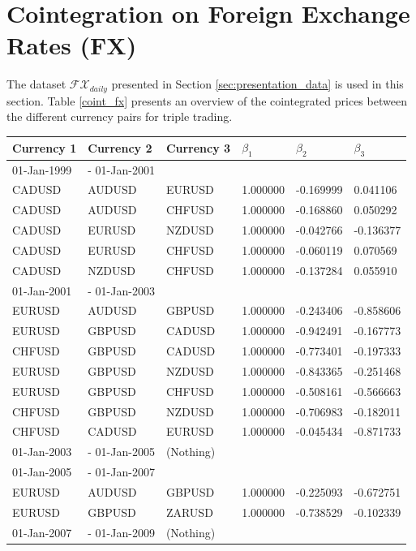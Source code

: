 \documentclass[11pt,a4,twosided,singlespacing,titlepagenumber=on]{scrreprt}
\numberwithin{equation}{chapter} %
\theoremstyle{remark}
\begin{document}
\section{Cointegration on Foreign Exchange Rates (FX)}

The dataset $\mathcal{FX}_{daily}$ presented in Section \ref{sec:presentation_data} is used in this section. Table \ref{coint_fx} presents an overview of the cointegrated prices between the different currency pairs for triple trading.

\begin{table}[H]
\centering
\begin{tabular}{llllll}
Currency 1      & Currency 2 & Currency 3 & $\beta_1$ & $\beta_2$ & $\beta_3$ \\ 
\hline
01-Jan-1999 &- 01-Jan-2001 \\
\hline
CADUSD & AUDUSD & EURUSD & 1.000000& -0.169999& 0.041106 \\
CADUSD & AUDUSD & CHFUSD & 1.000000& -0.168860& 0.050292 \\
CADUSD & EURUSD & NZDUSD & 1.000000& -0.042766& -0.136377 \\
CADUSD & EURUSD & CHFUSD & 1.000000& -0.060119& 0.070569 \\
CADUSD & NZDUSD & CHFUSD & 1.000000& -0.137284& 0.055910 \\
\hline
01-Jan-2001 &- 01-Jan-2003 \\
\hline
EURUSD & AUDUSD & GBPUSD & 1.000000& -0.243406& -0.858606 \\
EURUSD & GBPUSD & CADUSD & 1.000000& -0.942491& -0.167773 \\
CHFUSD & GBPUSD & CADUSD & 1.000000& -0.773401& -0.197333 \\
EURUSD & GBPUSD & NZDUSD & 1.000000& -0.843365& -0.251468 \\
EURUSD & GBPUSD & CHFUSD & 1.000000& -0.508161& -0.566663 \\
CHFUSD & GBPUSD & NZDUSD & 1.000000& -0.706983& -0.182011 \\
CHFUSD & CADUSD & EURUSD & 1.000000& -0.045434& -0.871733 \\
\hline
01-Jan-2003 &- 01-Jan-2005 &(Nothing)\\
\hline
01-Jan-2005 &- 01-Jan-2007 \\
\hline
EURUSD & AUDUSD & GBPUSD & 1.000000& -0.225093& -0.672751 \\
EURUSD & GBPUSD & ZARUSD & 1.000000& -0.738529& -0.102339 \\
\hline
01-Jan-2007 &- 01-Jan-2009 &(Nothing)\\

\end{tabular}
\end{table}
\end{document}
